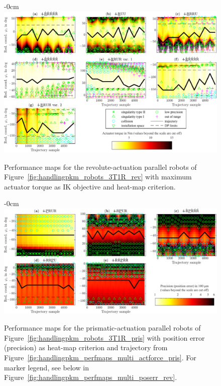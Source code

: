 \vspace{-12pt}
\begin{figure}[H]
\begin{adjustwidth}{-\extralength}{0cm}
  \centering
  \includegraphics{Figures/handlingpkm_perfmaps_default_revolute_multi_actforce_maxactforce.pdf}
\end{adjustwidth}
\caption{Performance
  maps for the  revolute-actuation parallel robots of Figure~\ref{fig:handlingpkm_robots_3T1R_rev} with maximum actuator torque as IK objective and heat-map criterion.}
\label{fig:handlingpkm_perfmaps_multi_actforce_rev}
\end{figure}

\begin{figure}[H]
\begin{adjustwidth}{-\extralength}{0cm}
  \centering
  \includegraphics{Figures/handlingpkm_perfmaps_default_prismatic_multi_positionerror_maxactforce.pdf}
\end{adjustwidth}
\caption{Performance
  maps for the prismatic-actuation parallel robots of Figure~\ref{fig:handlingpkm_robots_3T1R_pris} with position error (precision) as heat-map criterion and trajectory from Figure~\ref{fig:handlingpkm_perfmaps_multi_actforce_pris}. For marker legend, see below in Figure~\ref{fig:handlingpkm_perfmaps_multi_poserr_rev}.}
\label{fig:handlingpkm_perfmaps_multi_poserr_pris}
\end{figure}

